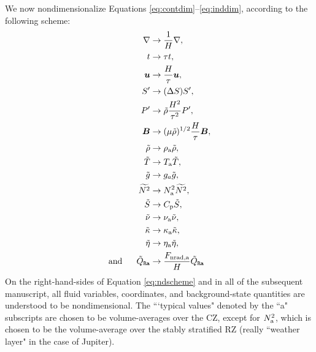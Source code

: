 \documentclass[12pt]{article}
\numberwithin{equation}{section}
\newcommand{\tmpa}{T_{\rm a}}
\newcommand{\rhoa}{\rho_{\rm a}}
\newcommand{\nsqa}{N^2_{\rm a}}
\newcommand{\nua}{\nu_{\rm a}}
\newcommand{\kappaa}{\kappa_{\rm a}}
\newcommand{\etaa}{\eta_{\rm a}}
\newcommand{\fnrada}{F_{\rm{nrad,a}}}
\begin{document}
	We now nondimensionalize Equations \eqref{eq:contdim}--\eqref{eq:inddim}, according to the following scheme:
	\begin{subequations}\label{eq:ndscheme}
	\begin{align}
		\nabla &\rightarrow \frac{1}{H}\nabla,\\
		t &\rightarrow \tau t,\\
		\vecu &\rightarrow \frac{H}{\tau} \vecu,\\
		\entrprime &\rightarrow (\Delta S) \entrprime,\\
		\prsprime &\rightarrow \tilde{\rho} \frac{H^2}{\tau^2} \prsprime,\\
		\vecb &\rightarrow (\mu\tilde{\rho})^{1/2}\frac{H}{\tau} \vecb,\\ 
		\rhotilde &\rightarrow \rhoa \rhotilde, \\
		\tmptilde &\rightarrow \tmpa \tmptilde,\\
		\gtilde &\rightarrow g_a \gtilde,\\
		\nsqtilde &\rightarrow \nsqa \nsqtilde,\\
		\entrtilde &\rightarrow \cpcap \entrtilde,\\
		\nutilde &\rightarrow \nua\nutilde,\\
		\kappatilde &\rightarrow\kappaa\kappatilde,\\
		 \etatilde &\rightarrow \etaa\etatilde,\\ 
		\andd \heatra &\rightarrow \frac{\fnrada}{H} \heatra
	\end{align}
	\end{subequations}
	On the right-hand-sides of Equation \eqref{eq:ndscheme} and in all of the subsequent manuscript, all fluid variables, coordinates, and background-state quantities are understood to be nondimensional. The ```typical values" denoted by the ``a" subscripts are chosen to be volume-averages over the CZ, except for $\nsqa$, which is chosen to be the volume-average over the stably stratified RZ (really ``weather layer" in the case of Jupiter). 
	
\end{document}
